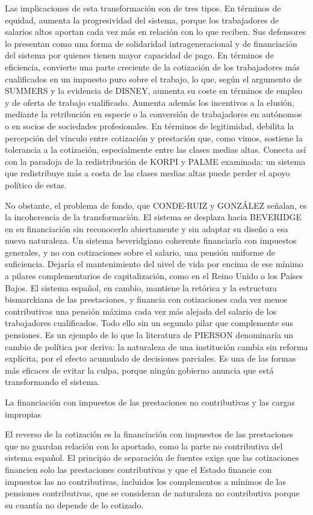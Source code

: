 \documentclass[10pt,a4paper]{article}
\begin{document}
Las implicaciones de esta transformación son de tres tipos. En términos de equidad, aumenta la progresividad del sistema, porque los trabajadores de salarios altos aportan cada vez más en relación con lo que reciben. Sus defensores lo presentan como una forma de solidaridad intrageneracional y de financiación del sistema por quienes tienen mayor capacidad de pago. En términos de eficiencia, convierte una parte creciente de la cotización de los trabajadores más cualificados en un impuesto puro sobre el trabajo, lo que, según el argumento de SUMMERS y la evidencia de DISNEY, aumenta su coste en términos de empleo y de oferta de trabajo cualificado. Aumenta además los incentivos a la elusión, mediante la retribución en especie o la conversión de trabajadores en autónomos o en socios de sociedades profesionales. En términos de legitimidad, debilita la percepción del vínculo entre cotización y prestación que, como vimos, sostiene la tolerancia a la cotización, especialmente entre las clases medias altas. Conecta así con la paradoja de la redistribución de KORPI y PALME examinada: un sistema que redistribuye más a costa de las clases medias altas puede perder el apoyo político de estas.

No obstante, el problema de fondo, que CONDE-RUIZ y GONZÁLEZ señalan, es la incoherencia de la transformación. El sistema se desplaza hacia BEVERIDGE en su financiación sin reconocerlo abiertamente y sin adaptar su diseño a esa nueva naturaleza. Un sistema beveridgiano coherente financiaría con impuestos generales, y no con cotizaciones sobre el salario, una pensión uniforme de suficiencia. Dejaría el mantenimiento del nivel de vida por encima de ese mínimo a pilares complementarios de capitalización, como en el Reino Unido o los Países Bajos. El sistema español, en cambio, mantiene la retórica y la estructura bismarckiana de las prestaciones, y financia con cotizaciones cada vez menos contributivas una pensión máxima cada vez más alejada del salario de los trabajadores cualificados. Todo ello sin un segundo pilar que complemente sus pensiones. Es un ejemplo de lo que la literatura de PIERSON denominaría un cambio de política por deriva: la naturaleza de una institución cambia sin reforma explícita, por el efecto acumulado de decisiones parciales. Es una de las formas más eficaces de evitar la culpa, porque ningún gobierno anuncia que está transformando el sistema.

La financiación con impuestos de las prestaciones no contributivas y las cargas impropias

El reverso de la cotización es la financiación con impuestos de las prestaciones que no guardan relación con lo aportado, como la parte no contributiva del sistema español. El principio de separación de fuentes exige que las cotizaciones financien solo las prestaciones contributivas y que el Estado financie con impuestos las no contributivas, incluidos los complementos a mínimos de las pensiones contributivas, que se consideran de naturaleza no contributiva porque su cuantía no depende de lo cotizado. 
\end{document}
